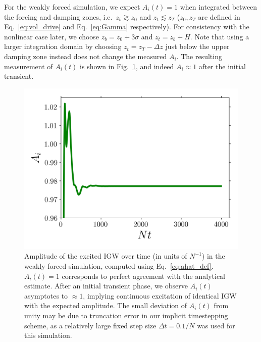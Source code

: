 \documentclass[
        fleqn,
        usenatbib,
    ]{mnras}
\begin{document}
For the weakly forced simulation, we expect
$A_i(t) = 1$ when integrated between the forcing and damping zones, i.e.\
$z_b \gtrsim z_0$ and $z_t \lesssim z_T$ ($z_0, z_T$ are defined in
Eq.~\eqref{eq:vol_drive} and Eq.~\eqref{eq:Gamma} respectively). For consistency
with the nonlinear case later, we choose $z_b = z_0 + 3\sigma$ and $z_t = z_b +
H$. Note that using a larger integration domain by choosing $z_t = z_T - \Delta
z$ just below the upper damping zone instead does not change the measured $A_i$.
The resulting measurement of $A_i(t)$ is shown in Fig.~\ref{fig:lin_amps}, and
indeed $A_i \approx 1$ after the initial transient.
\begin{figure}
    \centering
    \includegraphics[width=0.9\columnwidth]{plots/lin_amps.png}
    \caption{Amplitude of the excited IGW over time (in units of $N^{-1}$) in
    the weakly forced simulation, computed using Eq.~\eqref{eq:ahat_def}.
    $A_i(t) = 1$ corresponds to perfect agreement with the analytical estimate.
    After an initial transient phase, we observe $A_i(t)$ asymptotes to $\approx
    1$, implying continuous excitation of identical IGW with the expected
    amplitude. The small deviation of $A_i(t)$ from unity may be due to
    truncation error in our implicit timestepping scheme, as a
    relatively large fixed step size $\Delta t = 0.1/N$ was used for this
    simulation.}\label{fig:lin_amps}
\end{figure}
\end{document}
